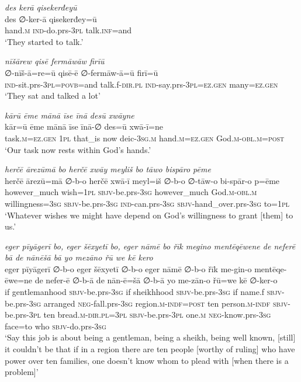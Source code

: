 \ea \label{ŠJ.84}
\textit{des kerā qisekerđeyū} \\ 
\gll des ∅-ker-ā qisekerđey=ū \\ 
 hand\textsc{.m} \textsc{ind-}do.prs\textsc{-3pl} talk\textsc{.inf}=and \\ 
\glt `They started to talk.'
\z 
 
\ea \label{ŠJ.85}
\textit{nīšārew qisē fermāwāw firīū} \\ 
\gll ∅-nīš-ā=re=ū qisē-ē ∅-fermāw-ā=ū firī=ū \\ 
 \textsc{ind-}sit.prs\textsc{-3pl}\textsc{=\textsc{povb}}=and talk.f\textsc{-dir}\textsc{.pl} \textsc{ind-}say.prs\textsc{-3pl}\textsc{=ez.gen} many\textsc{=ez.gen} \\ 
\glt `They sat and talked a lot'
\z 
 
\ea \label{ŠJ.88}
\textit{kārū ēme mānā īse īnā desū xwāyne} \\ 
\gll kār=ū ēme mānā īse īnā-∅ des=ū xwā-ī=ne \\ 
 task\textsc{.m}\textsc{=ez.gen} \textsc{1pl} that\_is now deic\textsc{-3sg}\textsc{.m} hand\textsc{.m}\textsc{=ez.gen} God\textsc{.m}\textsc{-obl}\textsc{.m}\textsc{=\textsc{post}} \\ 
\glt `Our task now rests within God’s hands.'
\z 
 
\ea \label{ŠJ.89}
\textit{herčē ārezūmā bo herčē xwāy meyliš bo tāwo bispāro pēme} \\ 
\gll herčē ārezū=mā ∅-b-o herčē xwā-ī meyl=iš ∅-b-o ∅-tāw-o bi-spār-o p=ēme \\ 
 however\_much wish\textsc{=\textsc{1pl}} \textsc{sbjv-}be.prs\textsc{-3sg} however\_much God\textsc{.m}\textsc{-obl}\textsc{.m} willingness\textsc{=3sg} \textsc{sbjv-}be.prs\textsc{-3sg} \textsc{ind-}can.prs\textsc{-3sg} \textsc{sbjv-}hand\_over.prs\textsc{-3sg} to=\textsc{1pl} \\ 
\glt `Whatever wishes we might have depend on God’s willingness to grant [them] to us.'
\z 
 
\ea \label{ŠJ.91}
\textit{eger pīyāgerī bo, eger šēxyetī bo, eger nāmē bo řīk megino mentēqēwene de neferē bā de nānēšā bā yo mezāno řū we kē kero} \\ 
\gll eger pīyāgerī ∅-b-o eger šēxyetī ∅-b-o eger nāmē ∅-b-o řīk me-gin-o mentēqe-ēwe=ne de nefer-ē ∅-b-ā de nān-ē=šā ∅-b-ā yo me-zān-o řū=we kē ∅-ker-o \\ 
 if gentlemanhood \textsc{sbjv-}be.prs\textsc{-3sg} if sheikhhood \textsc{sbjv-}be.prs\textsc{-3sg} if name.f \textsc{sbjv-}be.prs\textsc{-3sg} arranged \textsc{neg-}fall.prs\textsc{-3sg} region\textsc{.m}\textsc{-indf}\textsc{=\textsc{post}} ten person\textsc{.m}\textsc{-indf} \textsc{sbjv-}be.prs\textsc{-3pl} ten bread\textsc{.m}\textsc{-dir}\textsc{.pl}\textsc{=3pl} \textsc{sbjv-}be.prs\textsc{-3pl} one\textsc{.m} \textsc{neg-}know.prs\textsc{-3sg} face=to who \textsc{sbjv-}do.prs\textsc{-3sg} \\ 
\glt `Say this job is about being a gentleman, being a sheikh, being well known, [still] it couldn’t be that if in a region there are ten people [worthy of ruling] who have power over ten families, one doesn’t know whom to plead with [when there is a problem]'
\z 
 
